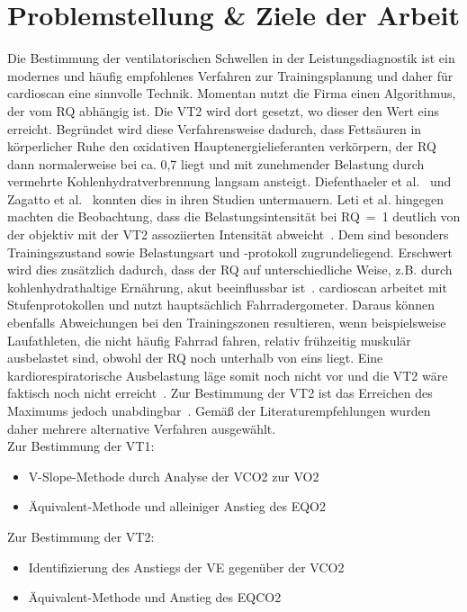\section{Problemstellung \& Ziele der Arbeit}
%
Die Bestimmung der ventilatorischen Schwellen in der Leistungsdiagnostik ist ein modernes und häufig empfohlenes Verfahren zur Trainingsplanung und daher für cardioscan eine sinnvolle Technik. Momentan nutzt die Firma einen Algorithmus, der vom RQ abhängig ist. Die VT2 wird dort gesetzt, wo dieser den Wert eins erreicht. Begründet wird diese Verfahrensweise dadurch, dass Fettsäuren in körperlicher Ruhe den oxidativen Hauptenergielieferanten verkörpern, der RQ dann normalerweise bei ca. 0,7 liegt und mit zunehmender Belastung durch vermehrte Kohlenhydratverbrennung langsam ansteigt. Diefenthaeler et al.~\cite{Diefenthaeler.2017} und Zagatto et al.~\cite{Zagatto.2012} konnten dies in ihren Studien untermauern. Leti et al. hingegen machten die Beobachtung, dass die Belastungsintensität bei RQ~=~1 deutlich von der objektiv mit der VT2 assoziierten Intensität abweicht~\cite{Leti.2012}. Dem sind besonders Trainingszustand sowie Belastungsart und -protokoll zugrundeliegend. Erschwert wird dies zusätzlich dadurch, dass der \gls{RQ} auf unterschiedliche Weise, z.B. durch kohlenhydrathaltige Ernährung, akut beeinflussbar ist~\cite{ScharhagRosenberger.2010}. cardioscan arbeitet mit Stufenprotokollen und nutzt hauptsächlich Fahrradergometer. Daraus können ebenfalls Abweichungen bei den Trainingszonen resultieren, wenn beispielsweise Laufathleten, die nicht häufig Fahrrad fahren, relativ frühzeitig muskulär ausbelastet sind, obwohl der RQ noch unterhalb von eins liegt. Eine kardiorespiratorische Ausbelastung läge somit noch nicht vor und die VT2 wäre faktisch noch nicht erreicht~\cite{Tzvetkov.2008}. Zur Bestimmung der VT2 ist das Erreichen des Maximums jedoch unabdingbar~\cite{ScharhagRosenberger.2013}. Gemäß der Literaturempfehlungen wurden daher mehrere alternative Verfahren ausgewählt.\\
Zur Bestimmung der VT1:
%
\begin{itemize}
	\item V-Slope-Methode durch Analyse der \gls{VCO2} zur \gls{VO2}
	\item Äquivalent-Methode und alleiniger Anstieg des \gls{EQO2}
\end{itemize}
%
Zur Bestimmung der VT2:
%
\begin{itemize}
	\item Identifizierung des Anstiegs der \gls{VE} gegenüber der \gls{VCO2}
	\item Äquivalent-Methode und Anstieg des \gls{EQCO2}
\end{itemize}

